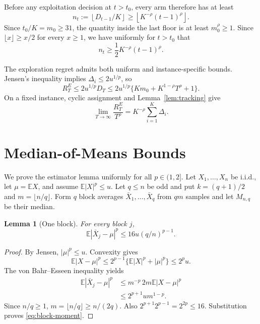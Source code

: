 \documentclass[twoside]{article}
\newtheorem{lemma}[theorem]{Lemma}
\newcommand{\E}{\mathbb E}
\begin{document}
Before any exploitation decision at $t>t_0$, every arm therefore has at
least
\begin{equation}
 n_t:=\left\lfloor D_{t-1}/K\right\rfloor
 \geq\left\lfloor K^{-\rho}(t-1)^\rho\right\rfloor.
 \label{eq:n-lower-floor}
\end{equation}
Since $t_0/K=m_0\geq31$, the quantity inside the last floor is at least
$m_0^\rho\geq1$. Since $\lfloor x\rfloor\geq x/2$ for every $x\geq1$,
we have uniformly for $t>t_0$ that
\begin{equation}
 n_t\geq\frac12K^{-\rho}(t-1)^\rho.
 \label{eq:n-lower}
\end{equation}

The exploration regret admits both uniform and instance-specific bounds.
Jensen's inequality implies $\Delta_i\leq2u^{1/p}$, so
\begin{equation}
 R_T^E\leq2u^{1/p}D_T
 \leq2u^{1/p}\{Km_0+K^{1-\rho}T^\rho+1\}.
 \label{eq:explore-uniform}
\end{equation}
On a fixed instance, cyclic assignment and Lemma~\ref{lem:tracking} give
\begin{equation}
 \lim_{T\to\infty}\frac{R_T^E}{T^\rho}
 =K^{-\rho}\sum_{i=1}^K\Delta_i.
 \label{eq:explore-instance}
\end{equation}

\section{Median-of-Means Bounds}
\label{app:mom}

We prove the estimator lemma uniformly for all $p\in(1,2]$. Let
$X_1,\ldots,X_n$ be i.i.d., let $\mu=\E X$, and assume
$\E|X|^p\leq u$. Let $q\leq n$ be odd and put $k=(q+1)/2$ and
$m=\lfloor n/q\rfloor$. Form $q$ block averages $\bar X_1,\ldots,\bar X_q$
from $qm$ samples and let $M_{n,q}$ be their median.

\begin{lemma}[One block]
\label{lem:block}
For every block $j$,
\begin{equation}
 \E|\bar X_j-\mu|^p
 \leq16u(q/n)^{p-1}.
 \label{eq:block-moment}
\end{equation}
\end{lemma}

\begin{proof}
By Jensen, $|\mu|^p\leq u$. Convexity gives
\[
 \E|X-\mu|^p
 \leq2^{p-1}\{\E|X|^p+|\mu|^p\}
 \leq2^p u.
\]
The von Bahr--Esseen inequality
\citep{vonbahr1965inequalities} yields
\begin{align*}
 \E|\bar X_j-\mu|^p
 &\leq m^{-p}\,2m\E|X-\mu|^p\\
 &\leq2^{p+1}u m^{1-p}.
\end{align*}
Since $n/q\geq1$, $m=\lfloor n/q\rfloor\geq n/(2q)$. Also
$2^{p+1}2^{p-1}=2^{2p}\leq16$. Substitution proves
\eqref{eq:block-moment}.
\end{proof}
\end{document}
